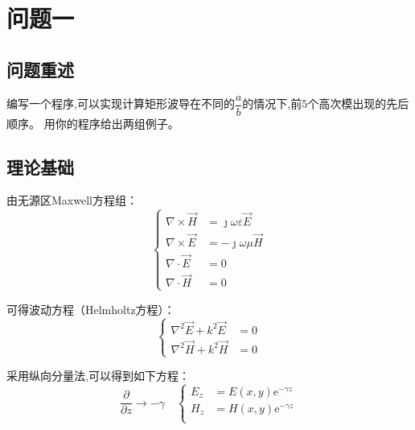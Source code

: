 \section{问题一}
\subsection{问题重述}
编写一个程序,可以实现计算矩形波导在不同的$\dfrac{a}{b}$的情况下,前$5$个高次模出现的先后顺序。
用你的程序给出两组例子。
\subsection{理论基础}
由无源区Maxwell方程组：
\begin{equation}\label{1}
    \left\{
    \begin{aligned}
        \nabla\times\vec{H} & =\jmath\omega\varepsilon\vec{E} \\
        \nabla\times\vec{E} & =-\jmath\omega\mu\vec{H}        \\
        \nabla\cdot \vec{E} & =0                              \\
        \nabla\cdot\vec{H}  & =0
    \end{aligned}\right.
\end{equation}

可得波动方程（Helmholtz方程）：
\begin{equation}\label{2}
    \left\{
    \begin{aligned}
        \nabla^2\vec{E} +k^2\vec{E} & =0 \\
        \nabla^2\vec{H} +k^2\vec{H} & =0
    \end{aligned}\right.
\end{equation}

采用纵向分量法,可以得到如下方程：
\begin{equation}\label{3}
    \dfrac{\partial }{\partial z} \to -\gamma\quad
    \left\{
    \begin{aligned}
        E_z & =E(x,y)\mathrm{e}^{-\gamma z} \\
        H_z & =H(x,y)\mathrm{e}^{-\gamma z} \\
    \end{aligned}\right.
\end{equation}

